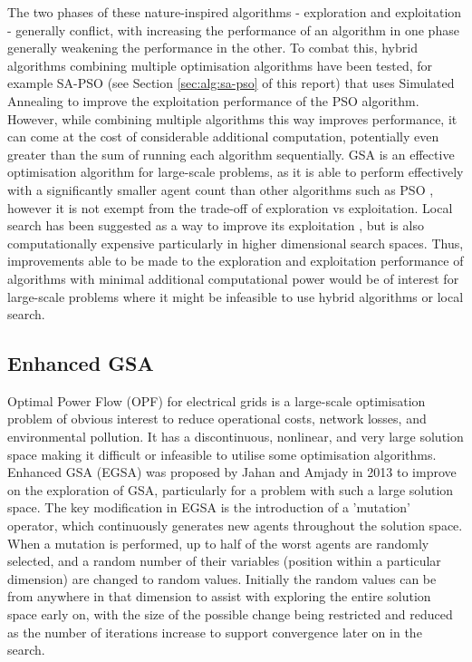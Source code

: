 The two phases of these nature-inspired algorithms - exploration and exploitation - generally conflict, with increasing the performance of an algorithm in one phase generally weakening the performance in the other.
To combat this, hybrid algorithms combining multiple optimisation algorithms have been tested, for example SA-PSO (see Section \ref{sec:alg:sa-pso} of this report) that uses Simulated Annealing to improve the exploitation performance of the PSO algorithm.
However, while combining multiple algorithms this way improves performance, it can come at the cost of considerable additional computation, potentially even greater than the sum of running each algorithm sequentially.
GSA is an effective optimisation algorithm for large-scale problems, as it is able to perform effectively with a significantly smaller agent count than other algorithms such as PSO \cite{EGSA}, however it is not exempt from the trade-off of exploration vs exploitation.
Local search has been suggested as a way to improve its exploitation \cite{GSA}, but is also computationally expensive particularly in higher dimensional search spaces.
Thus, improvements able to be made to the exploration and exploitation performance of algorithms with minimal additional computational power would be of interest for large-scale problems where it might be infeasible to use hybrid algorithms or local search.


\subsection{Enhanced GSA}\label{sec:alg:gsa:egsa}
Optimal Power Flow (OPF) for electrical grids is a large-scale optimisation problem of obvious interest to reduce operational costs, network losses, and environmental pollution.
It has a discontinuous, nonlinear, and very large solution space making it difficult or infeasible to utilise some optimisation algorithms.
Enhanced GSA (EGSA) was proposed by Jahan and Amjady \cite{EGSA} in 2013 to improve on the exploration of GSA, particularly for a problem with such a large solution space.
The key modification in EGSA is the introduction of a 'mutation' operator, which continuously generates new agents throughout the solution space.
When a mutation is performed, up to half of the worst agents are randomly selected, and a random number of their variables (position within a particular dimension) are changed to random values.
Initially the random values can be from anywhere in that dimension to assist with exploring the entire solution space early on, with the size of the possible change being restricted and reduced as the number of iterations increase to support convergence later on in the search.

